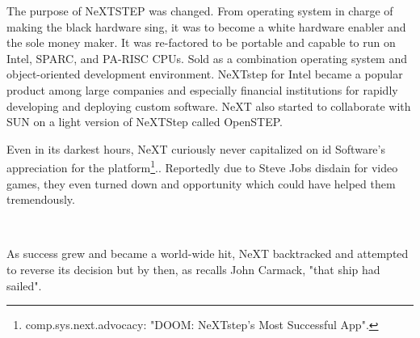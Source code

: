 \par
 The purpose of NeXTSTEP was changed. From operating system in charge of making the black hardware sing, it was to become a white hardware enabler and the sole money maker. It was re-factored to be portable and capable to run on Intel, SPARC, and PA-RISC CPUs. Sold as a combination operating system and object-oriented development environment. NeXTstep for Intel became a popular product among large companies and especially financial institutions for rapidly developing and deploying custom software. NeXT also started to collaborate with SUN on a light version of NeXTStep called OpenSTEP.\\
\par
Even in its darkest hours, NeXT curiously never capitalized on id Software's appreciation for the platform\footnote{comp.sys.next.advocacy: "DOOM: NeXTstep's Most Successful App".}.. Reportedly due to Steve Jobs disdain for video games, they even turned down and opportunity which could have helped them tremendously.\\
\par

\\
\par
{}
\par
 As \doom{} success grew and became a world-wide hit, NeXT backtracked and attempted to reverse its decision but by then, as recalls John Carmack, "that ship had sailed".


